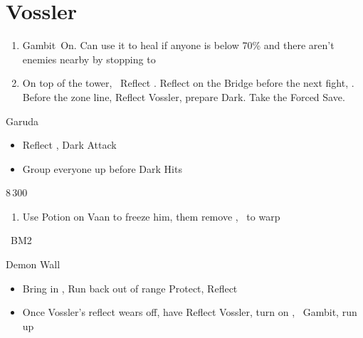 \chapter{Vossler}

\begin{enumerate}
	\item Gambit\ashe\ On. Can use it to heal if anyone is below 70\% and there aren't enemies nearby by stopping to \flee
	\item On top of the tower, \vaan\ Reflect \vaan. Reflect on the Bridge before the next fight, \leader{\penelo}. Before the zone line, Reflect Vossler, prepare Dark. Take the Forced Save.
\end{enumerate}
\begin{battle}{Garuda}
	\begin{itemize}
		\item Reflect \penelo, \ashe
		      \penelof Dark \ashe
		      \ashef Attack \penelo
		\item Group everyone up before Dark Hits
	\end{itemize}
\end{battle}
\begin{shop}{8\,300}
\end{shop}
\begin{enumerate}
	\item Use Potion on Vaan to freeze him, them remove \ashe, \penelo\ to warp
\end{enumerate}
\begin{liscense}
	\ashe\ BM2
\end{liscense}
\begin{gambit}
	\begin{itemize}
	\end{itemize}
\end{gambit}
\begin{battle}{Demon Wall}
	\begin{itemize}
		\item Bring in \ashe, \penelo
		      \vaanf Run back out of range
		      \vaanf Protect, Reflect \vaan
		\item Once Vossler's reflect wears off, have \vaan Reflect Vossler, turn on \ashe, \penelo\ Gambit, run up
	\end{itemize}
\end{battle}
